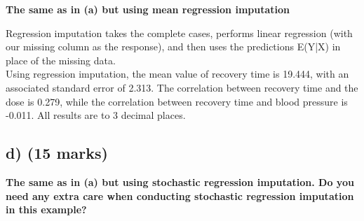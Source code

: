 \documentclass{article}
\numberwithin{equation}{section} %
\begin{document}
\textbf{The same as in (a) but using mean regression imputation}

\vspace{5mm}

Regression imputation takes the complete cases, performs linear regression (with our missing column as the response), and then uses the predictions E(Y|X) in place of the missing data.  \\

Using regression imputation, the mean value of recovery time is 19.444, with an associated standard error of 2.313. The correlation between recovery time and the dose is 0.279, while the correlation between recovery time and blood pressure is -0.011. All results are to 3 decimal places. 

\newpage
\subsection*{d) (15 marks)} 

\textbf{The same as in (a) but using stochastic regression imputation. Do you need any extra care when conducting stochastic regression imputation in this example?}
\end{document}
